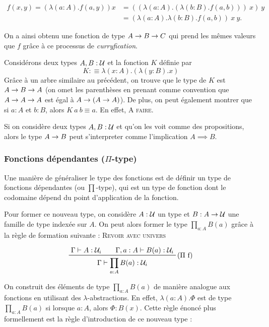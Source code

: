 \documentclass[../../rapport.tex]{subfiles}
\begin{document}
  \begin{align}
    f(x, y) = (\lambda(a : A). f(a, y)) x &= ((\lambda(a : A). (\lambda(b : B). f(a, b)))\ x)\ y \\ 
					  &= (\lambda(a : A).\lambda(b : B). f(a, b))\ x\ y.
  \end{align}

  On a ainsi obtenu une fonction de type $A \rightarrow B \rightarrow C$ qui prend les mêmes valeurs que $f$
  grâce à ce processus de \textit{curryfication}.

  \begin{example}
    Considérons deux types $A, B : \mathcal U$ et la fonction $K$ définie par
    $$K :\equiv \lambda(x : A).(\lambda(y : B).x)$$
    Grâce à un arbre similaire au précédent, on trouve que le type de $K$ est $A \rightarrow B \rightarrow A$
    (on omet les parenthèses en prenant comme convention que $A \rightarrow A \rightarrow A$ est égal à $A \rightarrow (A \rightarrow A)$).
    De plus, on peut également montrer que si $a : A$ et $b : B$, alors $K\ a\ b \equiv a$. En effet, \textsc{A faire.}
  \end{example}

  Si on considère deux types $A, B : \mathcal U$ et qu'on les voit comme des propositions,
  alors le type $A \rightarrow B$ peut s'interpreter comme l'implication $A \implies B$.

  \subsubsection{Fonctions dépendantes ($\Pi$-type)}

  Une manière de généraliser le type des fonctions est de définir un type de fonctions dépendantes (ou $\prod$-type),
  qui est un type de fonction dont le codomaine dépend du point d'application de la fonction.

  Pour former ce nouveau type, on considère $A : \mathcal U$ un type et $B : A \rightarrow \mathcal U$ une famille de type indexée sur $A$.
  On peut alors former le type $\prod_{a : A}{B(a)}$ grâce à la règle de formation suivante : \textsc{Revoir avec univers}

  $$
  \prfinterspace=2em
  \prftree[r]{($\Pi$ f)}{\Gamma \vdash A : \U_i}{\Gamma, a : A \vdash B(a) : \U_i}
    {\Gamma \vdash \prod_{a:A}{B(a)} : \U_i}
  $$

  On construit des éléments de type $\prod_{a:A}{B(a)}$ de manière analogue aux fonctions en utilisant des $\lambda$-abstractions.
  En effet, $\lambda(a : A). \Phi$ est de type $\prod_{a:A}{B(a)}$ si lorsque $a : A$, alors $\Phi : B(x)$.
  Cette règle énoncé plus formellement est la règle d'introduction de ce nouveau type :
\end{document}

